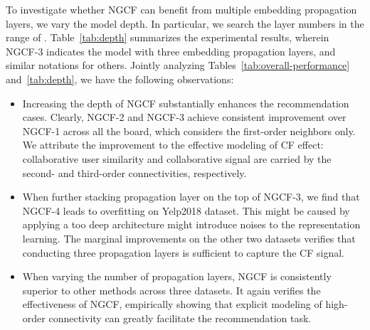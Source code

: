 \documentclass[sigconf]{acmart}
\theoremstyle{definition}
\begin{document}
\begin{table}[t]
\caption{Effect of embedding propagation layer numbers ().
}
\vspace{-10px}
\label{tab:depth}
\vspace{-10px}
\end{table}







To investigate whether NGCF can benefit from multiple embedding propagation layers, we vary the model depth.
In particular, we search the layer numbers in the range of .
Table~\ref{tab:depth} summarizes the experimental results, wherein NGCF-3 indicates the model with three embedding propagation layers, and similar notations for others.
Jointly analyzing Tables~\ref{tab:overall-performance} and~\ref{tab:depth}, we have the following observations:
\begin{itemize}[leftmargin=*]
\item Increasing the depth of NGCF substantially enhances the recommendation cases.
Clearly, NGCF-2 and NGCF-3 achieve consistent improvement over NGCF-1 across all the board, which considers the first-order neighbors only.
We attribute the improvement to the effective modeling of CF effect: collaborative user similarity and collaborative signal are carried by the second- and third-order connectivities, respectively.

\item When further stacking propagation layer on the top of NGCF-3, we find that NGCF-4 leads to overfitting on Yelp2018 dataset.
This might be caused by applying a too deep architecture might introduce noises to the representation learning.
The marginal improvements on the other two datasets verifies that conducting three propagation layers is sufficient to capture the CF signal.

\item When varying the number of propagation layers, NGCF is consistently superior to other methods across three datasets.
It again verifies the effectiveness of NGCF, empirically showing that explicit modeling of high-order connectivity can greatly facilitate the recommendation task.

\end{itemize}
\end{document}
